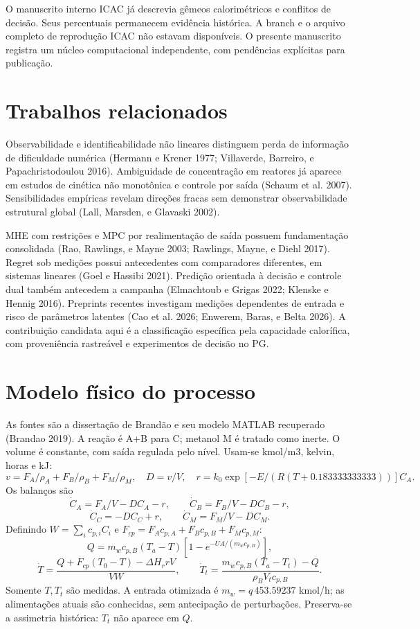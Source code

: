 \documentclass[
  11pt,
]{article}
\begin{document}
O manuscrito interno ICAC já descrevia gêmeos calorimétricos e conflitos
de decisão. Seus percentuais permanecem evidência histórica. A branch e
o arquivo completo de reprodução ICAC não estavam disponíveis. O
presente manuscrito registra um núcleo computacional independente, com
pendências explícitas para publicação.

\hypertarget{trabalhos-relacionados}{%
\section{Trabalhos relacionados}\label{trabalhos-relacionados}}

Observabilidade e identificabilidade não lineares distinguem perda de
informação de dificuldade numérica (Hermann e Krener 1977; Villaverde,
Barreiro, e Papachristodoulou 2016). Ambiguidade de concentração em
reatores já aparece em estudos de cinética não monotônica e controle por
saída (Schaum et al. 2007). Sensibilidades empíricas revelam direções
fracas sem demonstrar observabilidade estrutural global (Lall, Marsden,
e Glavaski 2002).

MHE com restrições e MPC por realimentação de saída possuem
fundamentação consolidada (Rao, Rawlings, e Mayne 2003; Rawlings, Mayne,
e Diehl 2017). Regret sob medições possui antecedentes com comparadores
diferentes, em sistemas lineares (Goel e Hassibi 2021). Predição
orientada à decisão e controle dual também antecedem a campanha
(Elmachtoub e Grigas 2022; Klenske e Hennig 2016). Preprints recentes
investigam medições dependentes de entrada e risco de parâmetros
latentes (Cao et al. 2026; Enwerem, Baras, e Belta 2026). A contribuição
candidata aqui é a classificação específica pela capacidade calorífica,
com proveniência rastreável e experimentos de decisão no PG.

\hypertarget{modelo-fuxedsico-do-processo}{%
\section{Modelo físico do processo}\label{modelo-fuxedsico-do-processo}}

As fontes são a dissertação de Brandão e seu modelo MATLAB recuperado
(Brandao 2019). A reação é A+B para C; metanol M é tratado como inerte.
O volume é constante, com saída regulada pelo nível. Usam-se kmol/m3,
kelvin, horas e kJ:
\[v=F_A/\rho_A+F_B/\rho_B+F_M/\rho_M,\quad D=v/V,\quad
r=k_0\exp[-E/(R(T+0.183333333333))]C_A.\] Os balanços são
\[\dot C_A=F_A/V-DC_A-r,\qquad\dot C_B=F_B/V-DC_B-r,\]
\[\dot C_C=-DC_C+r,\qquad\dot C_M=F_M/V-DC_M.\] Definindo
\(W=\sum_i c_{p,i}C_i\) e \(F_{cp}=F_Ac_{p,A}+F_Bc_{p,B}+F_Mc_{p,M}\):
\[Q=m_wc_{p,B}(T_a-T)[1-e^{-UA/(m_wc_{p,B})}],\]
\[\dot T=\frac{Q+F_{cp}(T_0-T)-\Delta H_r rV}{VW},\qquad
\dot T_t=\frac{m_wc_{p,B}(T_a-T_t)-Q}{\rho_BV_tc_{p,B}}.\] Somente
\(T,T_t\) são medidas. A entrada otimizada é \(m_w=q\,453.59237\)
kmol/h; as alimentações atuais são conhecidas, sem antecipação de
perturbações. Preserva-se a assimetria histórica: \(T_t\) não aparece em
\(Q\).
\end{document}
